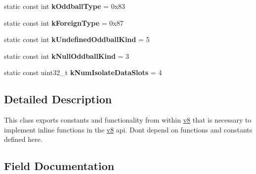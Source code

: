 \begin{DoxyCompactItemize}
\item 
static const int {\bfseries k\+Oddball\+Type} = 0x83\hypertarget{classv8_1_1internal_1_1Internals_a13081e936f8c96472f1b1496c70d4dc1}{}\label{classv8_1_1internal_1_1Internals_a13081e936f8c96472f1b1496c70d4dc1}

\item 
static const int {\bfseries k\+Foreign\+Type} = 0x87\hypertarget{classv8_1_1internal_1_1Internals_a263195f36f9e8ee64af70dc267a85d55}{}\label{classv8_1_1internal_1_1Internals_a263195f36f9e8ee64af70dc267a85d55}

\item 
static const int {\bfseries k\+Undefined\+Oddball\+Kind} = 5\hypertarget{classv8_1_1internal_1_1Internals_a39072b9e0ffea4031f4a1c514208b20d}{}\label{classv8_1_1internal_1_1Internals_a39072b9e0ffea4031f4a1c514208b20d}

\item 
static const int {\bfseries k\+Null\+Oddball\+Kind} = 3\hypertarget{classv8_1_1internal_1_1Internals_a72243c5512cb5cab9d10b6f29e775180}{}\label{classv8_1_1internal_1_1Internals_a72243c5512cb5cab9d10b6f29e775180}

\item 
static const uint32\+\_\+t {\bfseries k\+Num\+Isolate\+Data\+Slots} = 4\hypertarget{classv8_1_1internal_1_1Internals_a258de87ae638f06a1deebccf4fd93c3f}{}\label{classv8_1_1internal_1_1Internals_a258de87ae638f06a1deebccf4fd93c3f}

\end{DoxyCompactItemize}


\subsection{Detailed Description}
This class exports constants and functionality from within \hyperlink{namespacev8}{v8} that is necessary to implement inline functions in the \hyperlink{namespacev8}{v8} api. Don\textquotesingle{}t depend on functions and constants defined here. 

\subsection{Field Documentation}
